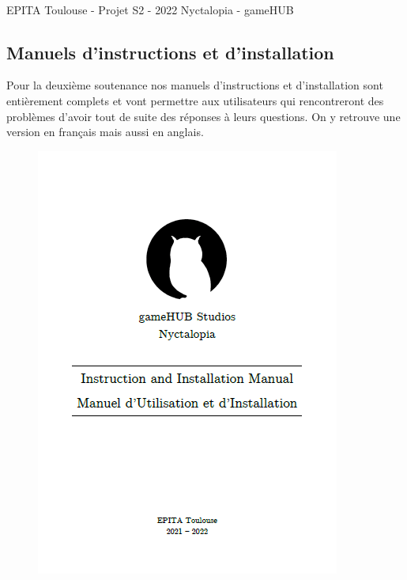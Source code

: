 \vfill
\noindent\makebox[\linewidth]{\rule{.8\paperwidth}{.6pt}}\\[0.2cm]
EPITA Toulouse - Projet S2 - 2022 \hfill Nyctalopia - gameHUB
\noindent\makebox[\linewidth]{\rule{.8\paperwidth}{.6pt}}
\newpage

\subsection{Manuels d'instructions et d'installation}
\setlength{\parindent}{5ex}
Pour la deuxième soutenance nos manuels d'instructions et d'installation sont entièrement complets et vont permettre aux utilisateurs qui rencontreront des problèmes d'avoir tout de suite des réponses à leurs questions. On y retrouve une version en français mais aussi en anglais.  

\begin{figure}[H]
\centering
\begin{minipage}{.5\textwidth}
  \centering
  \centerline{\includegraphics[width=0.8\linewidth]{img/M1.png}}
  \label{fig:manual}
\end{minipage}%
\end{figure}


